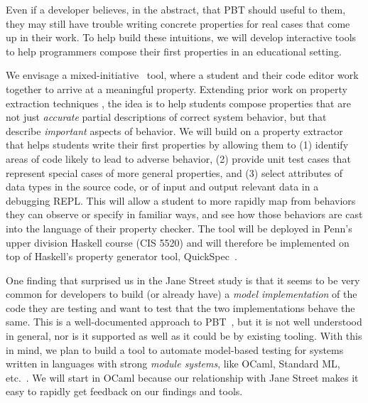 
%
Even if a developer believes, in the abstract, that PBT should useful
to them, they may still have trouble writing concrete properties
for real cases that come up in their work. To help build these
intuitions, we will develop
interactive tools to help programmers compose their first
properties in an educational setting.

We envisage a mixed-initiative~\cite{ref:allen1999mixed}
tool, where a student and their code editor work together to arrive at a
meaningful property. Extending prior work on property extraction techniques
\cite[etc.]{ref:ammons2002mining, ref:le2018deep, ref:claessen2010quickspec,
smith_discovering_2017}, the idea is to help students compose properties that
are not just {\em accurate} partial descriptions of correct system behavior, but
that describe {\em important} aspects of behavior. We will build
on a property
extractor that helps students write their first properties by allowing them
to (1) identify areas of code likely to lead to adverse behavior,
(2) provide unit test cases that represent special cases of more general
properties, and (3) select attributes of data types in the source code, or
of input and output relevant data in a debugging REPL. This
will allow a student to more rapidly map from behaviors they can
observe or specify in familiar ways, and see how those behaviors are cast into
the language of their property checker.
%
The tool will be deployed in Penn's upper division Haskell
course (CIS 5520) and will therefore be implemented on top of
Haskell's property
generator tool, QuickSpec~\cite{ref:claessen2010quickspec}. 


One finding that surprised us in the Jane Street study is that
it seems to be {very} common for developers to build (or already have) a
{\em model
implementation} of the code they are testing and want to test that
the two implementations behave the same.  This is a
well-documented approach to
  PBT~\cite{hughes_experiences_2016}, but it is not well understood in general,
  nor is it supported as well as it could
be by existing tooling.
%
With this in mind, we plan to build a tool to automate
model-based testing for systems written in languages with strong {\em
  module systems}, like OCaml, Standard ML, etc.~\cite{macqueen_modules_1984}.
We will start in OCaml because our relationship with Jane Street makes it easy
to rapidly get feedback on our findings and tools.

